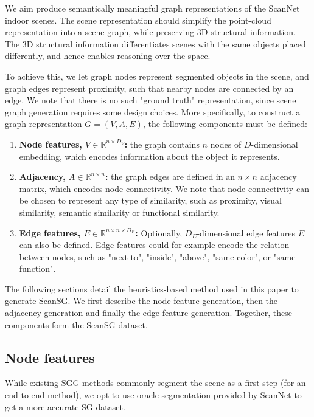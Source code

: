 We aim produce semantically meaningful graph representations of the ScanNet indoor scenes. The scene representation should simplify the point-cloud representation into a scene graph, while preserving 3D structural information. The 3D structural information differentiates scenes with the same objects placed differently, and hence enables reasoning over the space.

To achieve this, we let graph nodes represent segmented objects in the scene, and graph edges represent proximity, such that nearby nodes are connected by an edge. We note that there is no such "ground truth" representation, since scene graph generation requires some design choices. More specifically, to construct a graph representation $G = (V, A, E)$, the following components must be defined:

\begin{enumerate}
    \item \textbf{Node features, $V \in \mathbb{R}^{n \times D_V}$: } the graph contains $n$ nodes of $D$-dimensional embedding, which encodes information about the object it represents.
    \item \textbf{Adjacency, $A \in \mathbb{R}^{n \times n}$:} the graph edges are defined in an $n \times n$ adjacency matrix, which encodes node connectivity. We note that node connectivity can be chosen to represent any type of similarity, such as proximity, visual similarity, semantic similarity or functional similarity.
    \item \textbf{Edge features, $E \in \mathbb{R}^{n \times n \times D_E} $: } Optionally, $D_E$-dimensional edge features $E$ can also be defined. Edge features could for example encode the relation between nodes, such as "next to", "inside", "above", "same color", or "same function".
\end{enumerate}

The following sections detail the heuristics-based method used in this paper to generate ScanSG. We first describe the node feature generation, then the adjacency generation and finally the edge feature generation. Together, these components form the ScanSG dataset.

\subsection{Node features}
While existing SGG methods commonly segment the scene as a first step (for an end-to-end method), we opt to use oracle segmentation provided by ScanNet to get a more accurate SG dataset.

